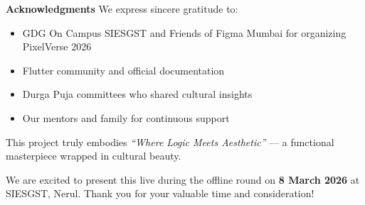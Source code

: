 \documentclass[11pt,a4paper]{article}
\begin{document}
\textbf{Acknowledgments}
We express sincere gratitude to:
\begin{itemize}
    \item GDG On Campus SIESGST and Friends of Figma Mumbai for organizing PixelVerse 2026
    \item Flutter community and official documentation
    \item Durga Puja committees who shared cultural insights
    \item Our mentors and family for continuous support
\end{itemize}

This project truly embodies \textit{``Where Logic Meets Aesthetic''} — a functional masterpiece wrapped in cultural beauty.

We are excited to present this live during the offline round on \textbf{8 March 2026} at SIESGST, Nerul.
Thank you for your valuable time and consideration!
\end{document}
